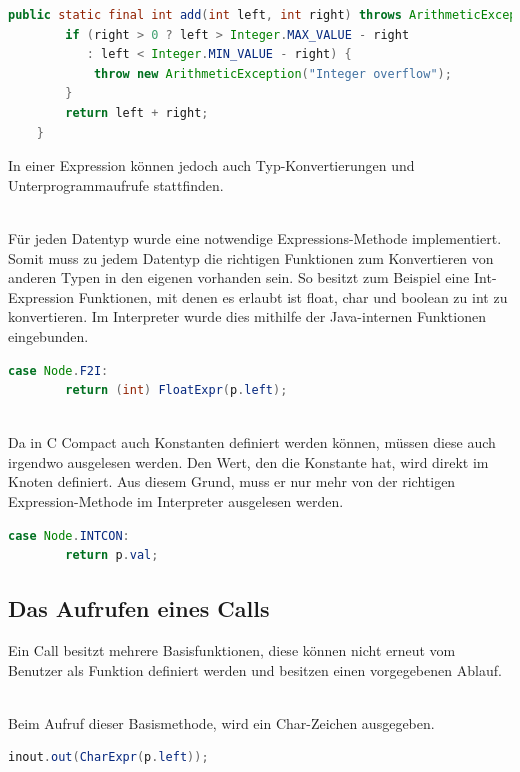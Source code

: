 \begin{lstlisting}[language=JAVA]
	public static final int add(int left, int right) throws ArithmeticException {
		if (right > 0 ? left > Integer.MAX_VALUE - right
           : left < Integer.MIN_VALUE - right) {
			throw new ArithmeticException("Integer overflow");
		}
		return left + right;
	}
\end{lstlisting}

In einer Expression können jedoch auch Typ-Konvertierungen und Unterprogrammaufrufe stattfinden.

\\
Für jeden Datentyp wurde eine notwendige Expressions-Methode implementiert. Somit muss zu jedem Datentyp die richtigen Funktionen zum Konvertieren von anderen Typen in den eigenen vorhanden sein. So besitzt zum Beispiel eine Int-Expression Funktionen, mit denen es erlaubt ist float, char und boolean zu int zu konvertieren.
Im Interpreter wurde dies mithilfe der Java-internen Funktionen eingebunden. 

\begin{lstlisting}[language=JAVA]
case Node.F2I:
		return (int) FloatExpr(p.left);
\end{lstlisting}


\\
Da in C Compact auch Konstanten definiert werden können, müssen diese auch irgendwo ausgelesen werden. Den Wert, den die Konstante hat, wird direkt im Knoten definiert. Aus diesem Grund, muss er nur mehr von der richtigen Expression-Methode im Interpreter ausgelesen werden.

\begin{lstlisting}[language=JAVA]
case Node.INTCON:
		return p.val;
\end{lstlisting}


\subsection{Das Aufrufen eines Calls}
Ein Call besitzt mehrere Basisfunktionen, diese können nicht erneut vom Benutzer als Funktion definiert werden und besitzen einen vorgegebenen Ablauf.

\\
Beim Aufruf dieser Basismethode, wird ein Char-Zeichen ausgegeben.
\begin{lstlisting}[language=JAVA]
inout.out(CharExpr(p.left));
\end{lstlisting}

